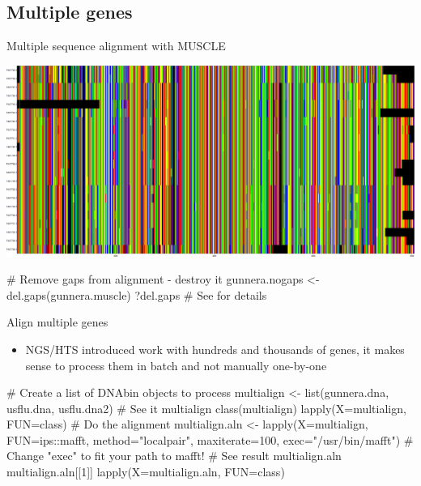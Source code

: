 \documentclass[compress, ucs, xelatex, 11pt, xcolor=svgnames, aspectratio=169,
	hyperref={
		bookmarks=true,
		unicode=true,
		colorlinks=true,
		pdftitle={Molecular data in R},
		plainpages=false,
		pdfauthor={Vojtech Zeisek},
		pdfsubject={Course about phylogeny and evolution in R},
		pdfcreator={XeLaTeX},
		pdfkeywords={R, evolution, phylogeny, molecular data},
		linkcolor=Crimson, %
		anchorcolor=Magenta, %
		citecolor=Magenta, %
		filecolor=Magenta, %
		menucolor=Magenta, %
		urlcolor=DodgerBlue, %
		pdftex},
	url={hyphens, lowtilde} %
	]{beamer}
\begin{document}
\subsection{Multiple genes}

\begin{frame}[fragile]{Multiple sequence alignment with MUSCLE}
	\begin{center}
		\includegraphics[width=\textwidth-5cm]{muscle.png}
	\end{center}
	\vfil
	\begin{spluscode}
    # Remove gaps from alignment - destroy it
    gunnera.nogaps <- del.gaps(gunnera.muscle)
    ?del.gaps # See for details
	\end{spluscode}
	\vfill
\end{frame}

\begin{frame}[fragile]{Align multiple genes}
	\begin{itemize}
		\item NGS/HTS introduced work with hundreds and thousands of genes, it makes sense to process them in batch and not manually one-by-one
	\end{itemize}
	\begin{spluscode}
    # Create a list of DNAbin objects to process
    multialign <- list(gunnera.dna, usflu.dna, usflu.dna2)
    # See it
    multialign
    class(multialign)
    lapply(X=multialign, FUN=class)
    # Do the alignment
    multialign.aln <- lapply(X=multialign, FUN=ips::mafft, method="localpair",
    maxiterate=100, exec="/usr/bin/mafft")
      # Change "exec" to fit your path to mafft!
    # See result
    multialign.aln
    multialign.aln[[1]]
    lapply(X=multialign.aln, FUN=class)
	\end{spluscode}
\end{frame}
\end{document}
